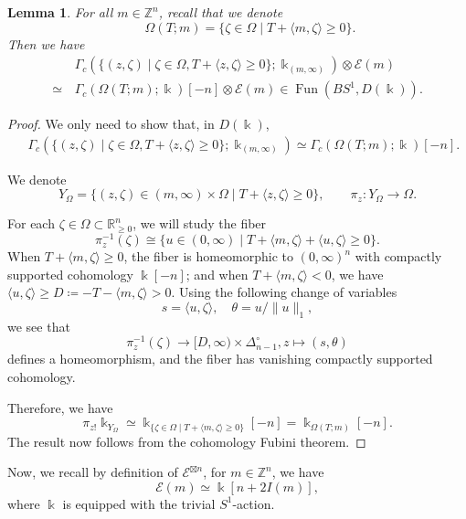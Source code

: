 \documentclass[11pt]{amsart}
\numberwithin{equation}{section}
\theoremstyle{plain}
\newtheorem{Lemma}[lemma]{Lemma}
\theoremstyle{definition}
\theoremstyle{remark}
\newcommand{\bZ} { {\mathbb{Z}}}
\newcommand{\bR} { {\mathbb{R}}}
\newcommand{\cE} { {\mathcal{E}}}
\newcommand\Fun{\operatorname{Fun}}
\begin{document}
\begin{Lemma}\label{lemma: cyclic trace coend integration}For all $m\in \bZ^n$, recall that we denote
\[
  \qquad \Omega(T;m)=\{\zeta\in \Omega\mid T+\langle m,\zeta\rangle\geq 0\}.
\]
Then we have
\begin{align*}&\,\Gamma_c\left({\{(z,\zeta)\mid \zeta\in \Omega, T+\langle z,\zeta\rangle \geq 0\}};\Bbbk_{(m,\infty)}\right)\otimes \cE(m) \\
\simeq &  \,\Gamma_c\left(\Omega(T;m) ;\Bbbk  \right)[-n]\otimes \cE(m) \in \Fun(BS^1,D(\Bbbk)).
\end{align*}
\end{Lemma}
\begin{proof}

We only need to show that, in $D(\Bbbk)$,
\begin{align*}
        &\,\Gamma_c({\{(z,\zeta)\mid \zeta\in \Omega, T+\langle z,\zeta\rangle \geq 0\}};\Bbbk_{(m,\infty)})\simeq\Gamma_c( \Omega(T;m) ;\Bbbk  )[-n].
\end{align*}

We denote 
\[Y_\Omega={\{(z,\zeta) \in (m,\infty)\times  \Omega\mid T+\langle z,\zeta\rangle \geq 0\}},\qquad \pi_{z}: Y_\Omega\to  \Omega.\]

For each $\zeta\in  \Omega \subset \bR^n_{\geq 0}$, we will study the fiber
\[\pi_z^{-1}(\zeta)\cong\{u\in (0,\infty)\mid T+\langle m,\zeta\rangle + \langle u,\zeta\rangle  \geq 0\}.  \]
When $T+\langle m,\zeta\rangle  \geq 0$, the fiber is homeomorphic to $(0,\infty)^n$ with compactly supported cohomology $\Bbbk [-n]$; and when $T+\langle m,\zeta \rangle  < 0$, we have $ \langle u,\zeta\rangle \geq D\coloneqq -T-\langle m,\zeta\rangle >0 $. Using the following change of variables
\[s=\langle u,\zeta\rangle,\quad \theta=u/\|u\|_1,\]
we see that 
\[\pi_z^{-1}(\zeta) \to [D,\infty)\times \Delta^\circ_{n-1}, z\mapsto (s,\theta)\]
defines a homeomorphism, and the fiber has vanishing compactly supported cohomology. 

Therefore, we have 
\[\pi_{z!}\Bbbk_{Y_\Omega}\simeq \Bbbk_{\{ \zeta\in  \Omega\mid T+\langle m,\zeta\rangle \geq 0\}}[-n]=\Bbbk_{ \Omega(T;m)}[-n]. \]
The result now follows from the cohomology Fubini theorem.
\end{proof} 

Now, we recall by definition of $\cE^{\boxtimes n}$, for $m\in \bZ^n$, we have
\[\cE(m)\simeq \Bbbk[n+2I(m)],\]
where $\Bbbk$ is equipped with the trivial $S^1$-action.
\end{document}
